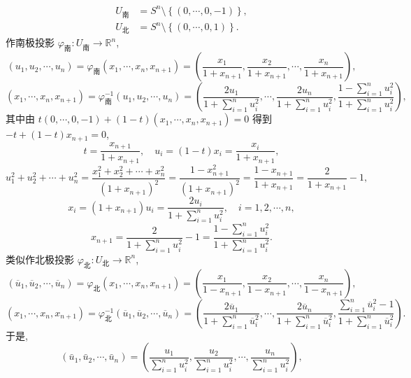 \begin{solution}[证法 2]
\begin{figure}[htbp]
  \caption{}\label{fig:11.2.17}
\end{figure}

\[
  \begin{aligned}
    U_{\text{南}} &=S^{n} \setminus\left\{(0, \cdots, 0,-1)\right\}, \\
    U_{\text{北}} &=S^{n} \setminus\left\{(0, \cdots, 0,1)\right\}.
  \end{aligned}
\]
作南极投影 $\varphi_{\text{南}}: U_{\text{南}} \to \mathbb{R}^{n}$,
\[
  \left(u_{1}, u_{2}, \cdots, u_{n}\right)=\varphi_{\text{南}}\left(x_{1}, \cdots, x_{n}, x_{n+1}\right)=\left(\frac{x_{1}}{1+x_{n+1}}, \frac{x_{2}}{1+x_{n+1}}, \cdots, \frac{x_{n}}{1+x_{n+1}}\right),
\]
\[
  \left(x_{1}, \cdots, x_{n}, x_{n+1}\right)=\varphi_{\text{南}}^{-1}\left(u_{1}, u_{2}, \cdots, u_{n}\right)=\left(\frac{2 u_{1}}{1+\sum_{i=1}^{n} u_{i}^{2}}, \cdots, \frac{2 u_{n}}{1+\sum_{i=1}^{n} u_{i}^{2}}, \frac{1-\sum_{i=1}^{n} u_{i}^{2}}{1+\sum_{i=1}^{n} u_{i}^{2}}\right),
\]
其中由 $t(0, \cdots, 0,-1)+(1-t)\left(x_{1}, \cdots, x_{n}, x_{n+1}\right)=0$ 得到 $-t+(1-t) x_{n+1}=0$,
\[
  t=\frac{x_{n+1}}{1+x_{n+1}}, \quad u_{i}=(1-t) x_{i}=\frac{x_{i}}{1+x_{n+1}},
\]
\[
  u_{1}^{2}+u_{2}^{2}+\cdots+u_{n}^{2}=\frac{x_{1}^{2}+x_{2}^{2}+\cdots+x_{n}^{2}}{\left(1+x_{n+1}\right)^{2}}=\frac{1-x_{n+1}^{2}}{\left(1+x_{n+1}\right)^{2}}=\frac{1-x_{n+1}}{1+x_{n+1}}=\frac{2}{1+x_{n+1}}-1,
\]
\[
  x_{i}=\left(1+x_{n+1}\right) u_{i}=\frac{2 u_{i}}{1+\sum_{i=1}^{n} u_{i}^{2}}, \quad i=1,2, \cdots, n,
\]
\[
  x_{n+1}=\frac{2}{1+\sum_{i=1}^{n} u_{i}^{2}}-1=\frac{1-\sum_{i=1}^{n} u_{i}^{2}}{1+\sum_{i=1}^{n} u_{i}^{2}}.
\]
类似作北极投影 $\varphi_{\text{北}}: U_{\text{北}} \to \mathbb{R}^{n}$,
\[
  \left(\overline{u}_{1}, \overline{u}_{2}, \cdots, \overline{u}_{n}\right)=\varphi_{\text{北}}\left(x_{1}, \cdots, x_{n}, x_{n+1}\right)=\left(\frac{x_{1}}{1-x_{n+1}}, \frac{x_{2}}{1-x_{n+1}}, \cdots, \frac{x_{n}}{1-x_{n+1}}\right),
\]
\[
  \left(x_{1}, \cdots, x_{n}, x_{n+1}\right)=\varphi_{\text{北}}^{-1}\left(\overline{u}_{1}, \overline{u}_{2}, \cdots, \overline{u}_{n}\right)=\left(\frac{2 \overline{u}_{1}}{1+\sum_{i=1}^{n} \overline{u}_{i}^{2}}, \cdots, \frac{2 \overline{u}_{n}}{1+\sum_{i=1}^{n} \overline{u}_{i}^{2}}, \frac{\sum_{i=1}^{n} \overline{u}_{i}^{2}-1}{1+\sum_{i=1}^{n} \overline{u}_{i}^{2}}\right).
\]
于是,
\[
  \left(\bar{u}_{1}, \bar{u}_{2}, \cdots, \bar{u}_{n}\right)=\left(\frac{u_{1}}{\sum_{i=1}^{n} u_{i}^{2}}, \frac{u_{2}}{\sum_{i=1}^{n} u_{i}^{2}}, \cdots, \frac{u_{n}}{\sum_{i=1}^{n} u_{i}^{2}}\right),
\]
\end{solution}
